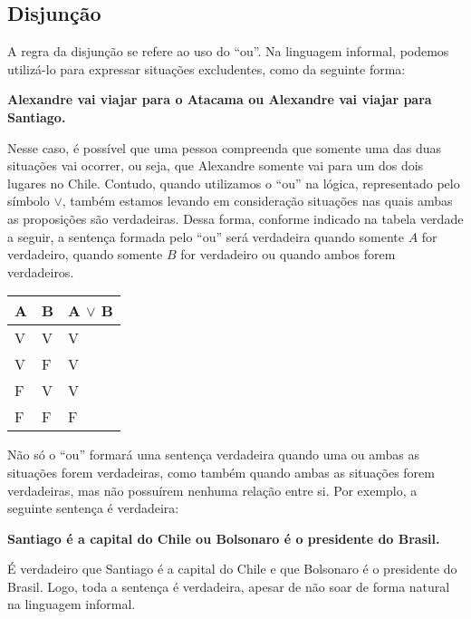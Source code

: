 \subsection{Disjunção}

A regra da disjunção se refere ao uso do ``ou''. Na linguagem informal, podemos utilizá-lo para expressar situações excludentes, como da seguinte forma:
\begin{center}
\textbf{Alexandre vai viajar para o Atacama ou Alexandre vai viajar para Santiago.}\\
\end{center}
Nesse caso, é possível que uma pessoa compreenda que somente uma das duas situações vai ocorrer, ou seja, que Alexandre somente vai para um dos dois lugares no Chile. Contudo, quando utilizamos o  ``ou'' na lógica, representado pelo símbolo $\lor$, também estamos levando em consideração situações nas quais ambas as proposições são verdadeiras. Dessa forma, conforme indicado na tabela verdade a seguir, a sentença formada pelo ``ou'' será verdadeira quando somente $A$ for verdadeiro, quando somente $B$ for verdadeiro ou quando ambos forem verdadeiros. 

\begin{table}[htb]
\centering
\begin{tabular}{|l|l|l|}
\hline
\textbf{A} & \textbf{B} & \textbf{A $\lor$ B} \\ \hline
V          & V          & V                 \\ \hline
V          & F          & V                 \\ \hline
F          & V          & V                 \\ \hline
F          & F          & F                 \\ \hline
\end{tabular}
\end{table}

Não só o ``ou'' formará uma sentença verdadeira quando uma ou ambas as situações forem verdadeiras, como também quando ambas as situações forem verdadeiras, mas não possuírem nenhuma relação entre si. Por exemplo, a seguinte sentença é verdadeira: 
\begin{center}
\textbf{Santiago é a capital do Chile ou Bolsonaro é o presidente do Brasil.}\\
\end{center}

É verdadeiro que Santiago é a capital do Chile e que Bolsonaro é o presidente do Brasil. Logo, toda a sentença é verdadeira, apesar de não soar de forma natural na linguagem informal.

